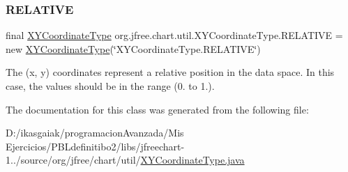 \subsubsection{\texorpdfstring{R\+E\+L\+A\+T\+I\+VE}{RELATIVE}}
{\footnotesize\ttfamily final \mbox{\hyperlink{classorg_1_1jfree_1_1chart_1_1util_1_1_x_y_coordinate_type}{X\+Y\+Coordinate\+Type}} org.\+jfree.\+chart.\+util.\+X\+Y\+Coordinate\+Type.\+R\+E\+L\+A\+T\+I\+VE = new \mbox{\hyperlink{classorg_1_1jfree_1_1chart_1_1util_1_1_x_y_coordinate_type}{X\+Y\+Coordinate\+Type}}(\char`\"{}X\+Y\+Coordinate\+Type.\+R\+E\+L\+A\+T\+I\+VE\char`\"{})\hspace{0.3cm}{\ttfamily [static]}}

The (x, y) coordinates represent a relative position in the data space. In this case, the values should be in the range (0. to 1.). 

The documentation for this class was generated from the following file\+:\begin{DoxyCompactItemize}
\item 
D\+:/ikasgaiak/programacion\+Avanzada/\+Mis Ejercicios/\+P\+B\+Ldefinitibo2/libs/jfreechart-\/1../source/org/jfree/chart/util/\mbox{\hyperlink{_x_y_coordinate_type_8java}{X\+Y\+Coordinate\+Type.\+java}}\end{DoxyCompactItemize}
